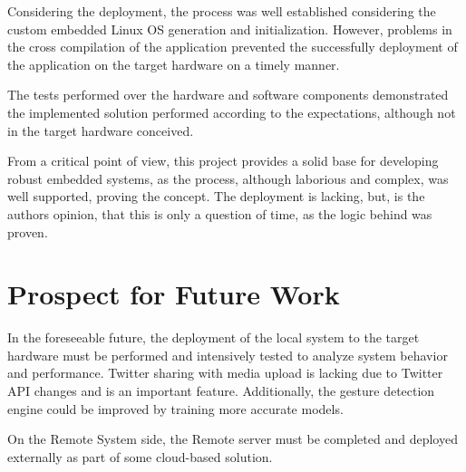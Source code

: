 Considering the deployment, the process was well established considering the
custom embedded Linux OS generation and initialization. However, problems in the
cross compilation of the application prevented the successfully deployment of
the application on the target hardware on a timely manner.

The tests performed over the hardware and software components demonstrated the
implemented solution performed according to the expectations, although not in
the target hardware conceived.

From a critical point of view, this project provides a solid base for developing
robust embedded systems, as the process, although laborious and complex, was
well supported, proving the concept. The deployment is lacking, but, is the
authors opinion, that this is only a question of time, as the logic behind was proven.

%
\section{Prospect for Future Work}%
\label{ch:conclusion-future-work}
In the foreseeable future, the deployment of the local system to the target
hardware must be performed and intensively tested to analyze system behavior and
performance. Twitter sharing with media upload is lacking due to Twitter API
changes and is an important feature. Additionally, the gesture detection engine
could be improved by training more accurate models.

On the Remote System side, the Remote server must be completed and deployed
externally as part of some cloud-based solution.
